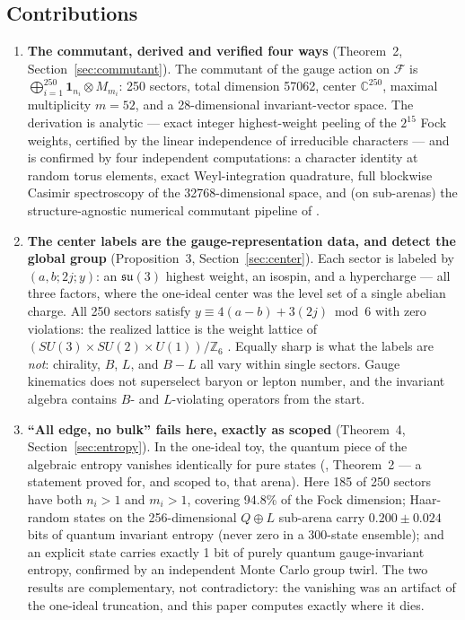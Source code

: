 \documentclass[11pt]{article}
\newcommand{\CC}{\mathbb{C}}
\newcommand{\ZZ}{\mathbb{Z}}
\newcommand{\Fock}{\mathcal{F}}
\newcommand{\su}[1]{\mathfrak{su}(#1)}
\begin{document}
\subsection{Contributions}

\begin{enumerate}

\item \textbf{The commutant, derived and verified four ways} (Theorem~2, Section~\ref{sec:commutant}). The commutant of the gauge action on $\Fock$ is $\bigoplus_{i=1}^{250} \mathbf{1}_{n_i}\otimes M_{m_i}$: 250 sectors, total dimension 57062, center $\CC^{250}$, maximal multiplicity $m=52$, and a 28-dimensional invariant-vector space. The derivation is analytic --- exact integer highest-weight peeling of the $2^{15}$ Fock weights, certified by the linear independence of irreducible characters --- and is confirmed by four independent computations: a character identity at random torus elements, exact Weyl-integration quadrature, full blockwise Casimir spectroscopy of the 32768-dimensional space, and (on sub-arenas) the structure-agnostic numerical commutant pipeline of \cite{p2}.

\item \textbf{The center labels are the gauge-representation data, and detect the global group} (Proposition~3, Section~\ref{sec:center}). Each sector is labeled by $(a,b;2j;y)$: an $\su3$ highest weight, an isospin, and a hypercharge --- all three factors, where the one-ideal center was the level set of a single abelian charge. All 250 sectors satisfy $y\equiv 4(a-b)+3(2j) \bmod 6$ with zero violations: the realized lattice is the weight lattice of $(SU(3)\times SU(2)\times U(1))/\ZZ_6$ \cite{tong}. Equally sharp is what the labels are \emph{not}: chirality, $B$, $L$, and $B-L$ all vary within single sectors. Gauge kinematics does not superselect baryon or lepton number, and the invariant algebra contains $B$- and $L$-violating operators from the start.

\item \textbf{``All edge, no bulk'' fails here, exactly as scoped} (Theorem~4, Section~\ref{sec:entropy}). In the one-ideal toy, the quantum piece of the algebraic entropy vanishes identically for pure states (\cite{p2}, Theorem~2 --- a statement proved for, and scoped to, that arena). Here 185 of 250 sectors have both $n_i>1$ and $m_i>1$, covering 94.8\% of the Fock dimension; Haar-random states on the 256-dimensional $Q\oplus L$ sub-arena carry $0.200 \pm 0.024$ bits of quantum invariant entropy (never zero in a 300-state ensemble); and an explicit state carries exactly 1 bit of purely quantum gauge-invariant entropy, confirmed by an independent Monte Carlo group twirl. The two results are complementary, not contradictory: the vanishing was an artifact of the one-ideal truncation, and this paper computes exactly where it dies.


\end{enumerate}
\end{document}
